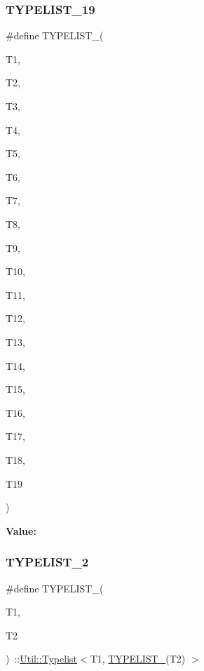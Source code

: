 \subsubsection{\texorpdfstring{TYPELIST\_19}{TYPELIST\_19}}
{\footnotesize\ttfamily \#define T\+Y\+P\+E\+L\+I\+S\+T\+\_(\begin{DoxyParamCaption}\item[{}]{T1,  }\item[{}]{T2,  }\item[{}]{T3,  }\item[{}]{T4,  }\item[{}]{T5,  }\item[{}]{T6,  }\item[{}]{T7,  }\item[{}]{T8,  }\item[{}]{T9,  }\item[{}]{T10,  }\item[{}]{T11,  }\item[{}]{T12,  }\item[{}]{T13,  }\item[{}]{T14,  }\item[{}]{T15,  }\item[{}]{T16,  }\item[{}]{T17,  }\item[{}]{T18,  }\item[{}]{T19 }\end{DoxyParamCaption})}

{\bfseries Value\+:}
\begin{DoxyCode}{0}

\end{DoxyCode}
\mbox{\label{adat-devel_2lib_2adat_2typelist_8h_a311cb99af993804c6737ae46c5cbfaff}} 
\subsubsection{\texorpdfstring{TYPELIST\_2}{TYPELIST\_2}}
{\footnotesize\ttfamily \#define T\+Y\+P\+E\+L\+I\+S\+T\+\_(\begin{DoxyParamCaption}\item[{}]{T1,  }\item[{}]{T2 }\end{DoxyParamCaption})~\+::\mbox{\hyperlink{structUtil_1_1Typelist}{Util\+::\+Typelist}}$<$T1, \mbox{\hyperlink{adat__devel__install_2include_2adat_2typelist_8h_a6a7a6aa3dece450c8d239713e2952df7}{T\+Y\+P\+E\+L\+I\+S\+T\+\_}}(T2) $>$}

